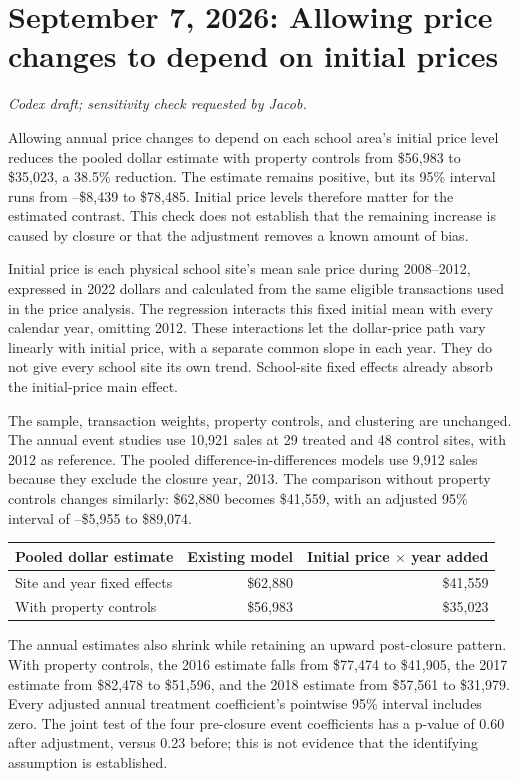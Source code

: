 \section*{September 7, 2026: Allowing price changes to depend on initial prices}
\textit{Codex draft; sensitivity check requested by Jacob.}

Allowing annual price changes to depend on each school area's initial price
level reduces the pooled dollar estimate with property controls from
\$56,983 to \$35,023, a 38.5\% reduction. The estimate remains positive,
but its 95\% interval runs from --\$8,439 to \$78,485. Initial price levels
therefore matter for the estimated contrast. This check does not establish
that the remaining increase is caused by closure or that the adjustment
removes a known amount of bias.

Initial price is each physical school site's mean sale price during
2008--2012, expressed in 2022 dollars and calculated from the same eligible
transactions used in the price analysis. The regression interacts this fixed
initial mean with every calendar year, omitting 2012. These interactions let
the dollar-price path vary linearly with initial price, with a separate common
slope in each year. They do not give every school site its own trend.
School-site fixed effects already absorb the initial-price main effect.

The sample, transaction weights, property controls, and clustering are
unchanged. The annual event studies use 10,921 sales at 29 treated and
48 control sites, with 2012 as reference. The pooled difference-in-differences
models use 9,912 sales because they exclude the closure year, 2013.
The comparison without property controls changes similarly:
\$62,880 becomes \$41,559, with an adjusted 95\% interval of
--\$5,955 to \$89,074.

\begin{center}
\begin{tabular}{lrr}
\hline
Pooled dollar estimate & Existing model & Initial price $\times$ year added \\
\hline
Site and year fixed effects & \$62,880 & \$41,559 \\
With property controls & \$56,983 & \$35,023 \\
\hline
\end{tabular}
\end{center}

The annual estimates also shrink while retaining an upward post-closure
pattern. With property controls, the 2016 estimate falls from \$77,474 to
\$41,905, the 2017 estimate from \$82,478 to \$51,596, and the 2018 estimate
from \$57,561 to \$31,979. Every adjusted annual treatment coefficient's
pointwise 95\% interval includes zero. The joint test of the four pre-closure
event coefficients has a p-value of 0.60 after adjustment, versus 0.23 before;
this is not evidence that the identifying assumption is established.

